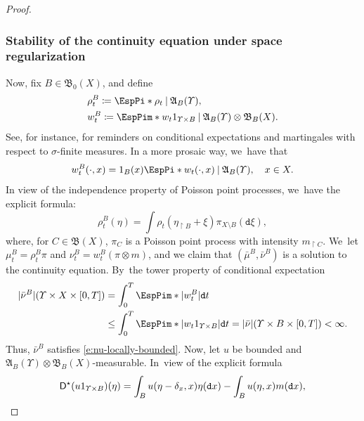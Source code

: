 \documentclass[JEP,XML,SOM,Unicode,published]{cedram}
\theoremstyle{definition}
\theoremstyle{remark}
\DeclarePairedDelimiter{\paren}{\lparen}{\rparen}
\DeclarePairedDelimiter{\abs}{\lvert}{\rvert}
\newcommand{\given}[1][]{%
\nonscript\:#1\vert
\allowbreak
\nonscript\:
\mathopen{}}
\begin{document}
\begin{proof}
\subsubsection*{Stability of the continuity equation under space regularization}
Now, fix $B \in \mathfrak{B}_{0}(X)$, and define
\begin{align*}
& \rho^{B}_{t} \coloneq \EspPi*{ \rho_{t} \given \mathfrak{A}_{B}(\varUpsilon) }, \\
& w^{B}_{t} \coloneq \EspPim*{ w_{t} 1_{\varUpsilon \times B} \given \mathfrak{A}_{B}(\varUpsilon) \otimes \mathfrak{B}_{B}(X) }.
\end{align*}
See, for instance, \cite[\S\S 39--43, pp.\,36--43]{DellacherieMeyerMartingales} for reminders on conditional expectations and martingales with respect to $\sigma$-finite measures.
In a more prosaic way, we~have that
\begin{equation}\label{e:w-conditional-x}
w^{B}_{t}(\cdot, x) = 1_{B}(x) \EspPi*{ w_{t}(\cdot, x) \given \mathfrak{A}_{B}(\varUpsilon) }, \quad x \in X.
\end{equation}
In view of the independence property of Poisson point processes, we~have the explicit formula:
\begin{equation*}
\rho^{B}_{t}(\eta) = \int \rho_{t}(\eta_{\restriction B} + \xi) \pi_{X \setminus B}(\mathtt{d} \xi),
\end{equation*}
where, for $C \in \mathfrak{B}(X)$, $\pi_{C}$ is a Poisson point process with intensity $m_{\restriction C}$. We~let $\mu_{t}^{B} = \rho_{t}^{B} \pi$ and $\nu_{t}^{B} = w_{t}^{B} (\pi \otimes m)$, and we claim that $(\bar{\mu}^{B}, \bar{\nu}^{B})$ is a solution to the continuity equation.
By~the tower property of conditional expectation
\begin{equation*}
\begin{split}
\abs{\bar{\nu}^{B}}(\varUpsilon \times X \times [0,T]) &= \int_{0}^{T} \EspPim*{ \abs{w_{t}^{B}} } \mathtt{d} t
\\& \leq \int_{0}^{T} \EspPim*{ \abs{w_{t} 1_{\varUpsilon \times B}} } \mathtt{d} t
= \abs{\bar{\nu}}(\varUpsilon \times B \times [0,T]) < \infty.
\end{split}
\end{equation*}
Thus, $\bar{\nu}^{B}$ satisfies \cref{e:nu-locally-bounded}.
Now, let $u$ be bounded and $\mathfrak{A}_{B}(\varUpsilon) \otimes \mathfrak{B}_{B}(X)$-measurable.
In~view of the explicit formula
\begin{equation*}
\mathsf{D}^{\star} \paren*{ u 1_{\varUpsilon \times B} }(\eta) = \int_{B} u(\eta - \delta_{x}, x) \eta(\mathtt{d} x) - \int_{B} u(\eta, x) m(\mathtt{d} x),

\end{equation*}
\end{proof}
\end{document}
